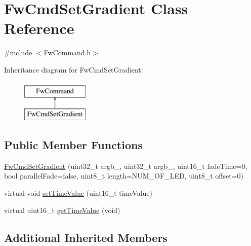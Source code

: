 \hypertarget{class_fw_cmd_set_gradient}{\section{Fw\-Cmd\-Set\-Gradient Class Reference}
\label{class_fw_cmd_set_gradient}
}


{\ttfamily \#include $<$Fw\-Command.\-h$>$}

Inheritance diagram for Fw\-Cmd\-Set\-Gradient\-:\begin{figure}[H]
\begin{center}
\leavevmode
\includegraphics[height=2.000000cm]{class_fw_cmd_set_gradient}
\end{center}
\end{figure}
\subsection*{Public Member Functions}
\begin{DoxyCompactItemize}
\item 
\hyperlink{class_fw_cmd_set_gradient_afbd92ede07c9c05c9754d9554f38c340}{Fw\-Cmd\-Set\-Gradient} (uint32\-\_\-t argb\-\_, uint32\-\_\-t argb\-\_, uint16\-\_\-t fade\-Time=0, bool parallel\-Fade=false, uint8\-\_\-t length=N\-U\-M\-\_\-\-O\-F\-\_\-\-L\-E\-D, uint8\-\_\-t offset=0)
\item 
virtual void \hyperlink{class_fw_cmd_set_gradient_ab484576c4e5ced92cbae1f6741a31c7c}{set\-Time\-Value} (uint16\-\_\-t time\-Value)
\item 
virtual uint16\-\_\-t \hyperlink{class_fw_cmd_set_gradient_a33d1b738ab73b6f7b6db877721ccbfeb}{get\-Time\-Value} (void)
\end{DoxyCompactItemize}
\subsection*{Additional Inherited Members}


